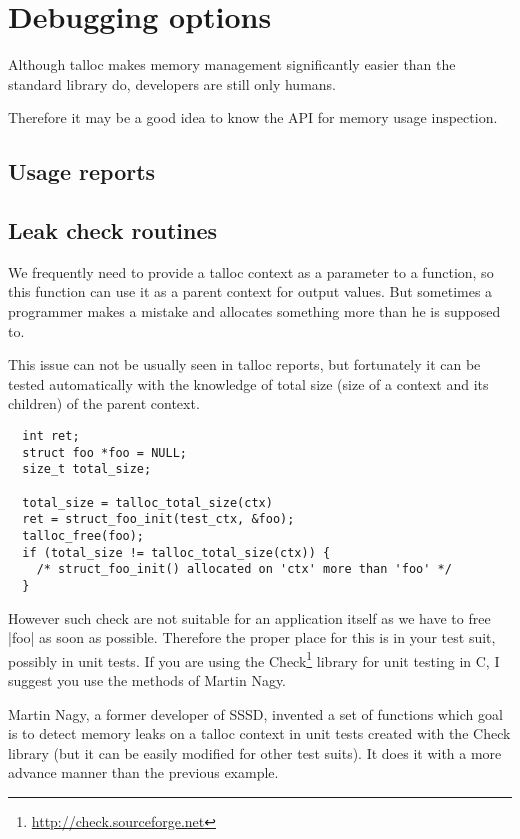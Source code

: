 \section{Debugging options}

Although talloc makes memory management significantly easier than the standard
library do, developers are still only humans.


 Therefore it may be a good idea to
know the API for memory usage inspection.

\subsection{Usage reports}



\subsection{Leak check routines}

We frequently need to provide a talloc context as a parameter to a function, so
this function can use it as a parent context for output values. But sometimes a
programmer makes a mistake and allocates something more than he is supposed to.

This issue can not be usually seen in talloc reports, but fortunately it can be
tested automatically with the knowledge of total size (size of a context and
its children) of the parent context.

\begin{lstlisting}
  int ret;
  struct foo *foo = NULL;
  size_t total_size;
  
  total_size = talloc_total_size(ctx)
  ret = struct_foo_init(test_ctx, &foo);
  talloc_free(foo);
  if (total_size != talloc_total_size(ctx)) {
    /* struct_foo_init() allocated on 'ctx' more than 'foo' */
  }
\end{lstlisting}

However such check are not suitable for an application itself as we have to free
|foo| as soon as possible. Therefore the proper place for this is in your test
suit, possibly in unit tests. If you are using the
Check\footnote{\url{http://check.sourceforge.net}} library for unit testing in
C, I suggest you use the methods of Martin Nagy.

Martin Nagy, a former developer of SSSD, invented a set of functions which goal
is to detect memory leaks on a talloc context in unit tests created with the
Check library (but it can be easily modified for other  test suits). It does it
with a more advance manner than the previous example.

